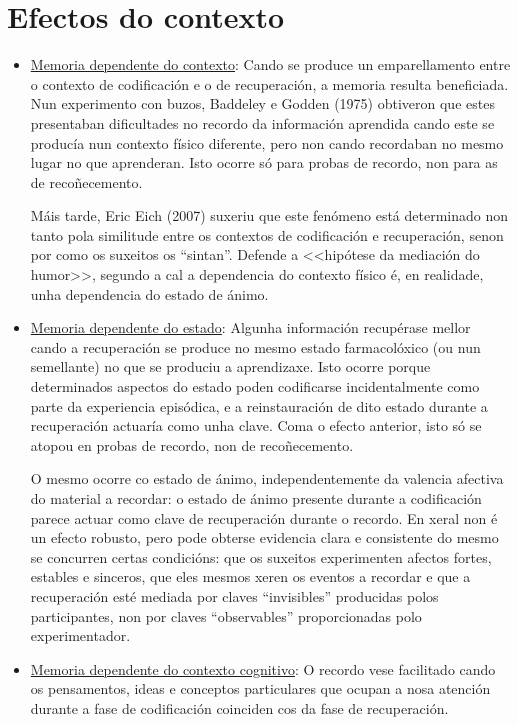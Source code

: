 \documentclass[a4paper,11pt]{article}
\begin{document}
\section{Efectos do contexto}
\begin{itemize}
	\item \underline{Memoria dependente do contexto}: Cando se produce un  emparellamento entre o 
	contexto de codificación e o de recuperación, a memoria resulta beneficiada. Nun experimento con 
	buzos, Baddeley e Godden (1975) obtiveron que estes presentaban dificultades no recordo da 
	información aprendida cando este se producía nun contexto físico diferente, pero non cando 
	recordaban no mesmo lugar no que aprenderan. Isto ocorre só para probas de recordo, non para as 
	de recoñecemento.
	
	Máis tarde, Eric Eich (2007) suxeriu que este fenómeno está determinado non tanto pola 
	similitude entre os contextos de codificación e recuperación, senon por como os suxeitos os 
	``sintan''. Defende a <<hipótese da mediación do humor>>, segundo a cal a dependencia do 
	contexto físico é, en realidade, unha dependencia do estado de ánimo. 
	\item \underline{Memoria dependente do estado}: Algunha información recupérase mellor cando a 
	recuperación se produce no mesmo estado farmacolóxico (ou nun semellante) no que se produciu a 
	aprendizaxe. Isto ocorre porque determinados aspectos do estado poden codificarse
	incidentalmente como parte da experiencia episódica, e a reinstauración de dito estado durante a 
	recuperación actuaría como unha clave. Coma o efecto anterior, isto só se atopou en probas de 
	recordo, non de recoñecemento.
	
	O mesmo ocorre co estado de ánimo, independentemente da valencia afectiva do material a 
	recordar: o estado de ánimo presente durante a codificación parece actuar como clave de 
	recuperación durante o recordo. En xeral non é un efecto robusto, pero pode obterse evidencia 
	clara e consistente do mesmo se concurren certas condicións: que os suxeitos experimenten 
	afectos fortes, estables e sinceros, que eles mesmos xeren os eventos a recordar e que a 
	recuperación esté mediada por claves ``invisibles'' producidas polos participantes, non por 
	claves ``observables'' proporcionadas polo experimentador.
	\item \underline{Memoria dependente do contexto cognitivo}: O recordo vese facilitado cando os 
	pensamentos, ideas e conceptos particulares que ocupan a nosa atención durante a fase de 
	codificación coinciden cos da fase de recuperación.
	

\end{itemize}
\end{document}
